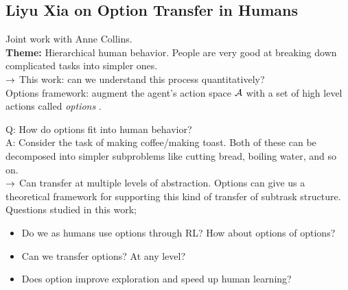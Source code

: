 \subsection{Liyu Xia on Option Transfer in Humans}

Joint work with Anne Collins. \\

{\bf Theme:} Hierarchical human behavior. People are very good at breaking down complicated tasks into simpler ones. \\

$\rightarrow$ This work: can we understand this process quantitatively? \\

Options framework: augment the agent's action space $\mathcal{A}$ with a set of high level actions called {\it options} \cite{sutton1999between}.


Q: How do options fit into human behavior? \\

A: Consider the task of making coffee/making toast. Both of these can be decomposed into simpler subproblems like cutting bread, boiling water, and so on. \\

$\rightarrow$ Can transfer at multiple levels of abstraction. Options can give us a theoretical framework for supporting this kind of transfer of subtrask structure. \\

Questions studied in this work;
\begin{itemize}
    \item Do we as humans use options through RL? How about options of options?
    \item Can we transfer options? At any level?
    \item Does option improve exploration and speed up human learning?
\end{itemize}

